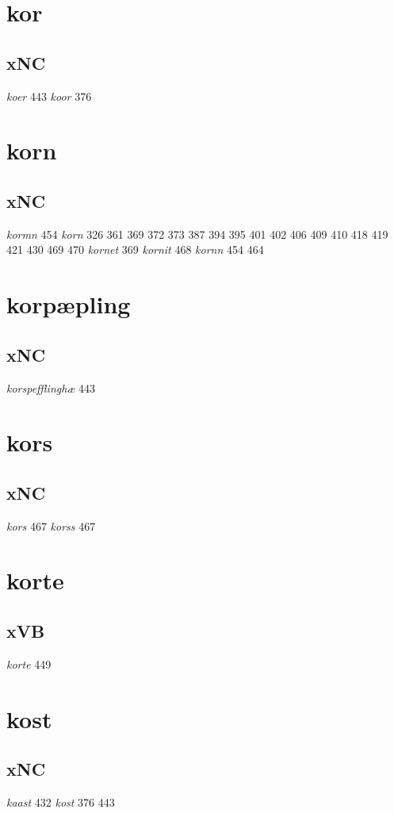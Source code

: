 \documentclass[a4paper,twocolumn]{article}
\begin{document}
\section{kor}
\label{sec:org21953ba}
\subsection{xNC}
\label{sec:org20d4c8b}
\emph{koer} 443 \emph{koor} 376 
\section{korn}
\label{sec:org816dc57}
\subsection{xNC}
\label{sec:orge3d8d14}
\emph{kormn} 454 \emph{korn} 326 361 369 372 373 387 394 395 401 402 406 409 410 418 419 421 430 469 470 \emph{kornet} 369 \emph{kornit} 468 \emph{kornn} 454 464 
\section{korpæpling}
\label{sec:org0d774ea}
\subsection{xNC}
\label{sec:orgc45a0f2}
\emph{korspefflinghæ} 443 
\section{kors}
\label{sec:org469d393}
\subsection{xNC}
\label{sec:org1e30df0}
\emph{kors} 467 \emph{korss} 467 
\section{korte}
\label{sec:org4f99866}
\subsection{xVB}
\label{sec:org8ec8f91}
\emph{korte} 449 
\section{kost}
\label{sec:org6d25e9a}
\subsection{xNC}
\label{sec:orgedf8bb1}
\emph{kaast} 432 \emph{kost} 376 443 
\end{document}
